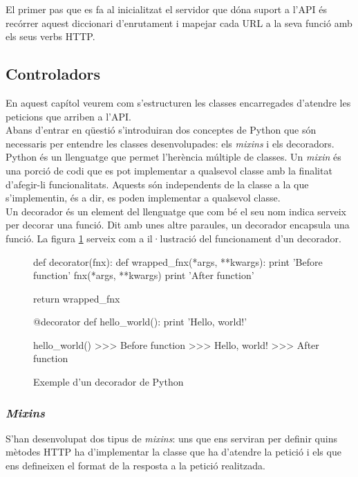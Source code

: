 El primer pas que es fa al inicialitzat el servidor que dóna suport a l'\ac{API} és recórrer aquest diccionari d'enrutament i mapejar cada \ac{URL} a la seva funció amb els seus verbs \ac{HTTP}.

\subsection{Controladors}

En aquest capítol veurem com s'estructuren les classes encarregades d'atendre les peticions que arriben a l'\ac{API}. \\

Abans d'entrar en qüestió s'introduiran dos conceptes de Python que són necessaris per entendre les classes desenvolupades: els \emph{mixins} i els decoradors.\\

Python és un llenguatge que permet l'herència múltiple de classes. Un \emph{mixin} és una porció de codi que es pot implementar a qualsevol classe amb la finalitat d'afegir-li funcionalitats. Aquests són independents de la classe a la que s'implementin, és a dir, es poden implementar a qualsevol classe.\\

Un decorador és un element del llenguatge que com bé el seu nom indica serveix per decorar una funció. Dit amb unes altre paraules, un decorador encapsula una funció. La figura \ref{fig:decorator} serveix com a il·lustració del funcionament d'un decorador.

\begin{figure}[h!]
	\begin{python}
def decorator(fnx):
	def wrapped_fnx(*args, **kwargs):
		print 'Before function'
		fnx(*args, **kwargs)
		print 'After function'

	return wrapped_fnx

@decorator
def hello_world():
	print 'Hello, world!'

hello_world()
>>> Before function
>>> Hello, world!
>>> After function
	\end{python}
	\caption{Exemple d'un decorador de Python}
	\label{fig:decorator}
\end{figure}

\subsubsection{\emph{Mixins}}

S'han desenvolupat dos tipus de \emph{mixins}: uns que ens serviran per definir quins mètodes \ac{HTTP} ha d'implementar la classe que ha d'atendre la petició i els que ens defineixen el format de la resposta a la petició realitzada.\\

